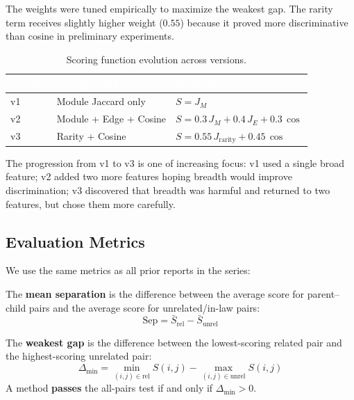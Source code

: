 \documentclass{../yalumba}
\begin{document}
\noindent The weights were tuned empirically to maximize the weakest gap.
The rarity term receives slightly higher weight ($0.55$) because it proved
more discriminative than cosine in preliminary experiments.

\begin{table}[H]
\centering
\tablestyle
\caption{Scoring function evolution across versions.}
\label{tab:scoring-evolution}
\begin{tabular}{@{}lll@{}}
\toprule
\rowcolor{table-header}
\textcolor{white}{\textbf{Version}} &
\textcolor{white}{\textbf{Components}} &
\textcolor{white}{\textbf{Formula}} \\
\midrule
v1 & Module Jaccard only & $S = J_M$ \\
v2 & Module + Edge + Cosine & $S = 0.3\,J_M + 0.4\,J_E + 0.3\,\cos$ \\
v3 & Rarity + Cosine & $S = 0.55\,J_{\text{rarity}} + 0.45\,\cos$ \\
\bottomrule
\end{tabular}
\end{table}

The progression from v1 to v3 is one of increasing focus: v1 used a single
broad feature; v2 added two more features hoping breadth would improve
discrimination; v3 discovered that breadth was harmful and returned to two
features, but chose them more carefully.

\subsection{Evaluation Metrics}

We use the same metrics as all prior reports in the series:

\begin{definition}
The \textbf{mean separation} is the difference between the average score for
parent--child pairs and the average score for unrelated/in-law pairs:
\begin{equation}
  \text{Sep} = \bar{S}_{\text{rel}} - \bar{S}_{\text{unrel}}
  \label{eq:separation}
\end{equation}
\end{definition}

\begin{definition}
The \textbf{weakest gap} is the difference between the lowest-scoring related
pair and the highest-scoring unrelated pair:
\begin{equation}
  \Delta_{\min} = \min_{(i,j) \in \text{rel}} S(i,j)
                  - \max_{(i,j) \in \text{unrel}} S(i,j)
  \label{eq:weakest-gap}
\end{equation}
A method \textbf{passes} the all-pairs test if and only if
$\Delta_{\min} > 0$.
\end{definition}
\end{document}
